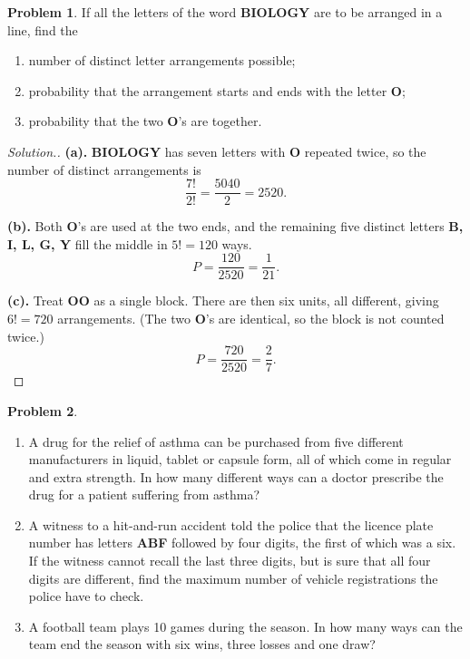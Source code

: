 \documentclass[12pt,a4paper]{report}
\theoremstyle{definition}
\theoremstyle{plain}
\theoremstyle{definition}
\newtheorem{problemx}{Problem}[section]
\newenvironment{problem}{\begin{problemx}}{\end{problemx}}
\newenvironment{solution}
  {\renewcommand{\qedsymbol}{}\begin{proof}[\textit{Solution}.]}
  {\end{proof}}
\begin{document}
\begin{problem}
If all the letters of the word \textbf{BIOLOGY} are to be arranged in a line,
find the
\begin{enumerate}
\item[(a).] number of distinct letter arrangements possible;
\item[(b).] probability that the arrangement starts and ends with the letter \textbf{O};
\item[(c).] probability that the two \textbf{O}'s are together.
\end{enumerate}
\end{problem}

\begin{solution}
\textbf{(a).} \textbf{BIOLOGY} has seven letters with \textbf{O} repeated twice,
so the number of distinct arrangements is
\[\frac{7!}{2!} = \frac{5040}{2} = 2520.\]

\textbf{(b).} Both \textbf{O}'s are used at the two ends, and the remaining five
distinct letters \textbf{B, I, L, G, Y} fill the middle in $5! = 120$ ways.
\[P = \frac{120}{2520} = \frac{1}{21}.\]

\textbf{(c).} Treat \textbf{OO} as a single block. There are then six units, all
different, giving $6! = 720$ arrangements. (The two \textbf{O}'s are identical,
so the block is not counted twice.)
\[P = \frac{720}{2520} = \frac{2}{7}.\]
\end{solution}

\begin{problem}
\begin{enumerate}
\item[(a).] A drug for the relief of asthma can be purchased from five different
manufacturers in liquid, tablet or capsule form, all of which come in regular
and extra strength. In how many different ways can a doctor prescribe the drug
for a patient suffering from asthma?
\item[(b).] A witness to a hit-and-run accident told the police that the licence
plate number has letters \textbf{ABF} followed by four digits, the first of
which was a six. If the witness cannot recall the last three digits, but is sure
that all four digits are different, find the maximum number of vehicle
registrations the police have to check.
\item[(c).] A football team plays 10 games during the season. In how many
ways can the team end the season with six wins, three losses and one draw?
\end{enumerate}
\end{problem}
\end{document}
